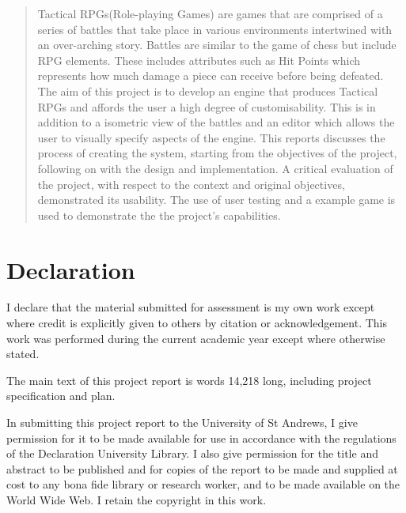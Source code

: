 
\begin{abstract}

Tactical RPGs(Role-playing Games) are games that are comprised of a series of battles that take place in various environments intertwined with an over-arching story. Battles are similar to the game of chess but include RPG elements. These includes attributes such as Hit Points which represents how much damage a piece can receive before being defeated.  The aim of this project is  to develop an engine that produces Tactical RPGs and affords the user a high degree of customisability. This is in addition to a isometric view of the battles and an editor which allows the user to visually specify aspects of the engine. This reports discusses the process of creating the system, starting from the objectives of the project, following on with the design and implementation.  A critical evaluation of the project, with respect to the context and original objectives, demonstrated its usability. The use of user testing and a example game is used to demonstrate the the project's capabilities.

\end{abstract}

\sectionfont{
	\sectionrule{0pt}{0pt}{-10pt}{0.8pt}
}

\section*{Declaration}
I declare that the material submitted for assessment is my own work except where credit is explicitly given to others by citation or acknowledgement. This work was performed during the current academic year except where otherwise stated.

The main text of this project report is words 14,218 long, including project specification and plan. 

In submitting this project report to the University of St Andrews, I give permission for it to be made available for use in accordance with the regulations of the Declaration University Library. I also give permission for the title and abstract to be published and for copies of the report to be made and supplied at cost to any bona fide library or research worker, and to be made available on the World Wide Web. I retain the copyright in this work.

